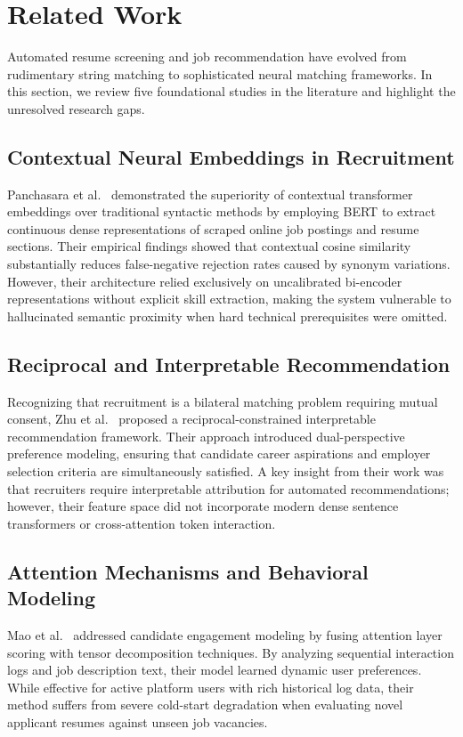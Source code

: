 \documentclass[conference]{IEEEtran}
\begin{document}
\section{Related Work}

Automated resume screening and job recommendation have evolved from rudimentary string matching to sophisticated neural matching frameworks. In this section, we review five foundational studies in the literature and highlight the unresolved research gaps.

\subsection{Contextual Neural Embeddings in Recruitment}
Panchasara et al.~\cite{panchasara2023} demonstrated the superiority of contextual transformer embeddings over traditional syntactic methods by employing BERT to extract continuous dense representations of scraped online job postings and resume sections. Their empirical findings showed that contextual cosine similarity substantially reduces false-negative rejection rates caused by synonym variations. However, their architecture relied exclusively on uncalibrated bi-encoder representations without explicit skill extraction, making the system vulnerable to hallucinated semantic proximity when hard technical prerequisites were omitted.

\subsection{Reciprocal and Interpretable Recommendation}
Recognizing that recruitment is a bilateral matching problem requiring mutual consent, Zhu et al.~\cite{zhu2021} proposed a reciprocal-constrained interpretable recommendation framework. Their approach introduced dual-perspective preference modeling, ensuring that candidate career aspirations and employer selection criteria are simultaneously satisfied. A key insight from their work was that recruiters require interpretable attribution for automated recommendations; however, their feature space did not incorporate modern dense sentence transformers or cross-attention token interaction.

\subsection{Attention Mechanisms and Behavioral Modeling}
Mao et al.~\cite{mao2023} addressed candidate engagement modeling by fusing attention layer scoring with tensor decomposition techniques. By analyzing sequential interaction logs and job description text, their model learned dynamic user preferences. While effective for active platform users with rich historical log data, their method suffers from severe cold-start degradation when evaluating novel applicant resumes against unseen job vacancies.
\end{document}
